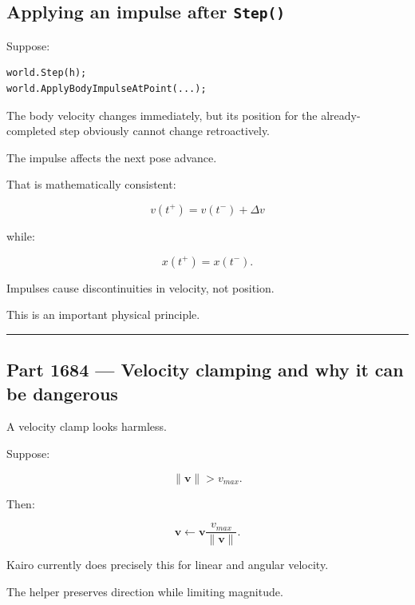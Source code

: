 \subsection{\texorpdfstring{Applying an impulse after \texttt{Step()}}{Applying an impulse after Step()}}\label{06-engine-ii-ch038-applying-an-impulse-after-step}

\hypertarget{06-engine-ii-ch038-applying-an-impulse-after-step}{}

Suppose:

\begin{verbatim}
world.Step(h);
world.ApplyBodyImpulseAtPoint(...);
\end{verbatim}

The body velocity changes immediately, but its position for the already-completed step obviously cannot change retroactively.

The impulse affects the next pose advance.

That is mathematically consistent:

\[
v(t^+)=v(t^-)+\Delta v
\]

while:

\[
x(t^+)=x(t^-).
\]

Impulses cause discontinuities in velocity, not position.

This is an important physical principle.

\begin{center}\rule{0.5\linewidth}{0.5pt}\end{center}

\subsection{Part 1684 --- Velocity clamping and why it can be dangerous}\label{06-engine-ii-ch038-part-1684-velocity-clamping-and-why-it-can-be-dangerous}

\hypertarget{06-engine-ii-ch038-part-1684-velocity-clamping-and-why-it-can-be-dangerous}{}

A velocity clamp looks harmless.

Suppose:

\[
\|\mathbf v\|>v_{max}.
\]

Then:

\[
\boxed{
\mathbf v
\leftarrow
\mathbf v
\frac{v_{max}}{\|\mathbf v\|}.
}
\]

Kairo currently does precisely this for linear and angular velocity.

The helper preserves direction while limiting magnitude.

